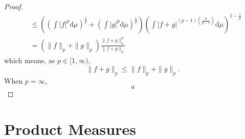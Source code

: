 \begin{proof}
\begin{equation*}
\begin{aligned}
                            & \leq\left(\left(\int|f|^{p} \mathrm{d} \mu\right)^{\frac{1}{p}}+\left(\int|g|^{p} \mathrm{d} \mu\right)^{\frac{1}{p}}\right)\left(\int|f+g|^{(p-1)\left(\frac{p}{p-1}\right)} \mathrm{d} \mu\right)^{1-\frac{1}{p}} \\
                            & =\left(\|f\|_{p}+\|g\|_{p}\right) \frac{\|f+g\|_{p}^{p}}{\|f+g\|_{p}}
        \end{aligned}
    \end{equation*}
    which means, as $p\in[1,\infty)$,
    \begin{equation*}
        \|f+g\|_{p} \leq\|f\|_{p}+\|g\|_{p}.
    \end{equation*}
    When $p=\infty$,
    \begin{equation*}
        a
    \end{equation*}
\end{proof}

\begin{theorem}

\end{theorem}

\begin{theorem}

\end{theorem}

\begin{theorem}

\end{theorem}

\section{Product Measures}

\begin{theorem}

\end{theorem}